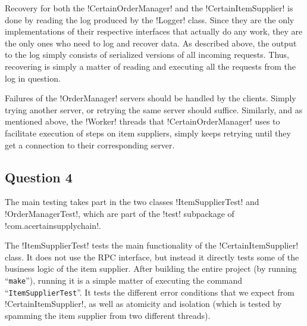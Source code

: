 \documentclass[a4paper, 12pt]{article}
\begin{document}

Recovery for both the !CertainOrderManager! and the
!CertainItemSupplier! is done by reading the log produced by the
!Logger! class. Since they are the only implementations of their
respective interfaces that actually do any work, they are the only
ones who need to log and recover data. As described above, the output
to the log simply consists of serialized versions of all incoming
requests. Thus, recovering is simply a matter of reading and executing
all the requests from the log in question.

Failures of the !OrderManager! servers should be handled by the
clients. Simply trying another server, or retrying the same server
should suffice. Similarly, and as mentioned above, the !Worker!
threads that !CertainOrderManager! uses to facilitate execution of
steps on item suppliers, simply keeps retrying until they get a
connection to their corresponding server.


\subsection*{Question 4}





The main testing takes part in the two classes !ItemSupplierTest! and
!OrderManagerTest!, which are part of the !test! subpackage of
!com.acertainsupplychain!.

The !ItemSupplierTest! tests the main functionality of the
!CertainItemSupplier! class. It does not use the RPC interface, but
instead it directly tests some of the business logic of the item
supplier. After building the entire project (by running
``\texttt{make}''), running it is a simple matter of executing the
command ``\texttt{ItemSupplierTest}''. It tests the
different error conditions that we expect from !CertainItemSupplier!,
as well as atomicity and isolation (which is tested by spamming the
item supplier from two different threads).
\end{document}
